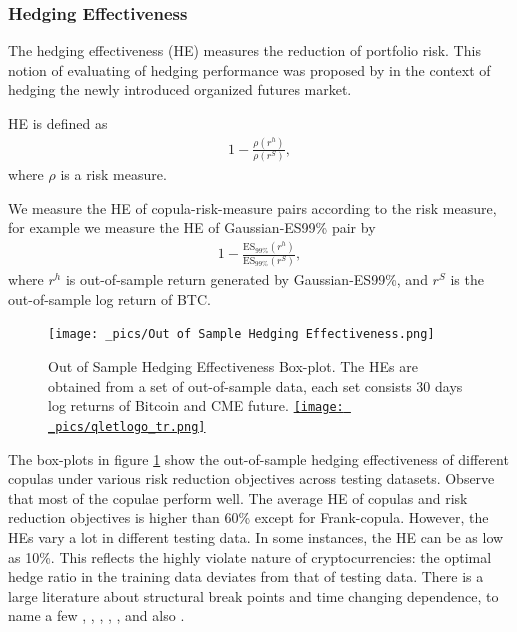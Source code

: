 \subsubsection{Hedging Effectiveness}\label{subsubsec:hedging-effectiveness}
The hedging effectiveness (HE) measures the reduction of portfolio risk.
This notion of evaluating of hedging performance was proposed by \citet{ederington1979hedging} in the context of hedging the newly introduced
organized futures market.\medskip

HE is defined as
\begin{align}
  1- \frac{\rho(r^h)}{\rho(r^S)},
  \end{align}
where $\rho$ is a risk measure.

We measure the HE of copula-risk-measure pairs according to the risk measure, for example we measure the
HE of Gaussian-ES99\% pair by
\begin{align}
  1- \frac{\text{ES}_{99\%}(r^h)}{\text{ES}_{99\%}(r^S)},
  \end{align}
where $r^h$ is out-of-sample return generated by Gaussian-ES99\%, and $r^S$ is the out-of-sample log return of BTC. \medskip

\begin{figure}[H]
   \centering
   \texttt{[image: \_pics/Out of Sample Hedging Effectiveness.png]}
   \caption{Out of Sample Hedging Effectiveness Box-plot.
   The HEs are obtained from a set of out-of-sample data,
   each set consists 30 days log returns of Bitcoin and CME future.
   \href{http://www.quantlet.com/}{\texttt{[image: \_pics/qletlogo\_tr.png]}}}
   \label{fig:OOSHE}
\end{figure}

The box-plots in figure \ref{fig:OOSHE} show the out-of-sample hedging effectiveness of different copulas under various risk
reduction objectives across testing datasets.
Observe that most of the copulae perform well.
The average HE of copulas and risk reduction objectives is higher than 60\% except for Frank-copula.
However, the HEs vary a lot in different testing data.
In some instances, the HE can be as low as 10\%.
This reflects the highly violate nature of cryptocurrencies:
the optimal hedge ratio in the training data deviates from that of testing data.
There is a large literature about structural break points and time changing dependence, to name a few
\citet{hafner2012dynamic}, \citet{patton2006modelling}, \citet{creal2008general},
\citet{engle2002dynamic}, \citet{giacomini2009inhomogeneous}, and also
\citet{manner2012survey}.\medskip



